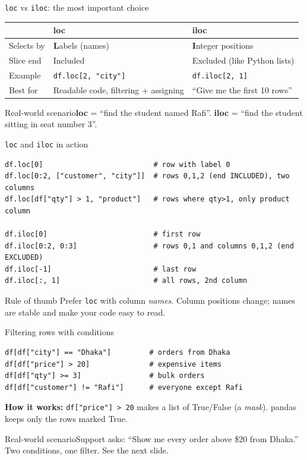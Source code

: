 \documentclass[aspectratio=169,10pt]{beamer}
\newcommand{\code}[1]{\texttt{#1}}
\newcommand{\scenario}[1]{\begin{exampleblock}{Real-world scenario}#1\end{exampleblock}}
\begin{document}
\begin{frame}{\texttt{loc} vs \texttt{iloc}: the most important choice}
  \begin{center}
  \renewcommand{\arraystretch}{1.3}
  \begin{tabular}{p{2.2cm}p{4.2cm}p{4.8cm}}
    \toprule
     & \textbf{loc} & \textbf{iloc}\\
    \midrule
    Selects by & \textbf{L}abels (names) & \textbf{I}nteger positions\\
    Slice end & \alert{Included} & Excluded (like Python lists)\\
    Example & \code{df.loc[2, "city"]} & \code{df.iloc[2, 1]}\\
    Best for & Readable code, filtering + assigning & ``Give me the first 10 rows''\\
    \bottomrule
  \end{tabular}
  \end{center}
  \vspace{2mm}
  \scenario{\textbf{loc} = ``find the student named Rafi''. \textbf{iloc} = ``find the
  student sitting in seat number 3''.}
\end{frame}

\begin{frame}[fragile]{\texttt{loc} and \texttt{iloc} in action}
\begin{lstlisting}
df.loc[0]                          # row with label 0
df.loc[0:2, ["customer", "city"]]  # rows 0,1,2 (end INCLUDED), two columns
df.loc[df["qty"] > 1, "product"]   # rows where qty>1, only product column

df.iloc[0]                         # first row
df.iloc[0:2, 0:3]                  # rows 0,1 and columns 0,1,2 (end EXCLUDED)
df.iloc[-1]                        # last row
df.iloc[:, 1]                      # all rows, 2nd column
\end{lstlisting}
  \begin{block}{Rule of thumb}
    Prefer \code{loc} with column \emph{names}. Column positions change; names are stable and
    make your code easy to read.
  \end{block}
\end{frame}

\begin{frame}[fragile]{Filtering rows with conditions}
\begin{lstlisting}
df[df["city"] == "Dhaka"]         # orders from Dhaka
df[df["price"] > 20]              # expensive items
df[df["qty"] >= 3]                # bulk orders
df[df["customer"] != "Rafi"]      # everyone except Rafi
\end{lstlisting}
  \textbf{How it works:} \code{df["price"] > 20} makes a list of True/False (a \emph{mask}).
  pandas keeps only the rows marked True.
  \scenario{Support asks: ``Show me every order above \$20 from Dhaka.'' Two conditions, one
  filter. See the next slide.}
\end{frame}
\end{document}
